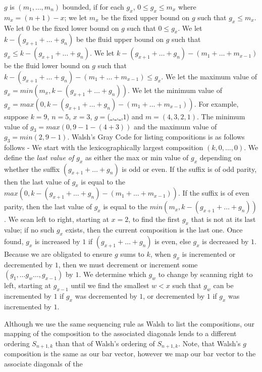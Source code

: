 $g$ is $(m_{1}, \dots, m_{n})$ bounded, if for each $g_{x}$, $0 \leq g_{x} \leq m_{x}$ where $m_{x}=(n+1)-x$; 
we let $m_{x}$ be the fixed upper bound on $g$ such that $g_{x} \leq m_{x}$. 
We let $0$ be the fixed lower bound on $g$ 
such that $0 \leq g_{x}$. We let $k-(g_{x+1}+ \dots +g_{n})$ be the fluid upper bound on $g$ such that $g_{x} \leq k-(g_{x+1}+ \dots +g_{n})$. 
We let $k-(g_{x+1}+ \dots +g_{n}) - (m_{1} + \dots + m_{x-1})$ be the fluid lower bound on $g$ such that 
$k-(g_{x+1} + \dots + g_{n}) - (m_{1} + \dots + m_{x-1}) \leq g_{x}$. We let the maximum value of $g_{x}=min(m_{x}, k-(g_{x+1}+ \dots + g_{n}))$. 
We let the minimum value of $g_{x}=max(0, k-(g_{x+1} + \dots +g_{n})-(m_{1} + \dots + m_{x-1}))$. For example, suppose $k=9$, $n=5$, $x=3$, $g=$(\underline{  },\underline{  },\underline{  },$1$)
 and $m=(4,3,2,1)$. The minimum value of $g_{3}=max(0, 9 - 1 - (4+3))$ and the maximum value of $g_{3}=min(2, 9-1)$. 
 Walsh's Gray Code for listing compositions is as follows follows - We start with the lexicographically largest composition $(k,0, \dots ,0)$. We define the 
 \emph{last value of $g_{x}$} as either the max or min value of $g_{x}$ 
 depending on whether the suffix $(g_{x+1}+ \dots +g_{n})$ is odd or even. If the suffix is of odd parity, then the last value of $g_{x}$ is 
 equal to the $max(0, k-(g_{x+1} + \dots + g_{n})-(m_{1} + \dots + m_{x-1}))$. If the suffix is of even parity, then the last value of 
 $g_{x}$ is equal to the $min(m_{x}, k-(g_{x+1} + \dots + g_{n}))$. We 
 scan left to right, starting at $x=2$, to find the first $g_{x}$ that is not at its last value; if no such $g_{x}$ exists, then the current composition 
 is the last one. Once found, $g_{x}$ is increased by $1$ if $(g_{x+1} + \dots + g_{n})$ is even, else $g_{x}$ is decreased by $1$. Because we are 
 obligated to ensure $g$ sums to $k$, when $g_{x}$ is incremented or decremented by $1$, then we must decrement or increment some $(g_{1}, \dots g_{w} \dots, g_{x-1})$ 
 by $1$. We determine which $g_{w}$ to change by scanning right to left, starting at $g_{x-1}$ until we find the smallest $w<x$ such that 
 $g_{w}$ can be incremented by $1$ if $g_{x}$ was decremented by $1$, or decremented by $1$ if $g_{x}$ was incremented by $1$.\par 
 Although we use the same sequencing rule as Walsh to list the compositions, our mapping of the composition 
 to the associated diagonals lends to a different ordering $S_{n+1,k}$ than that of Walsh's ordering of $S_{n+1,k}$. Note, 
 that Walsh's $g$ composition is the same as our bar vector, however we map our bar vector to the associate diagonals of the 
